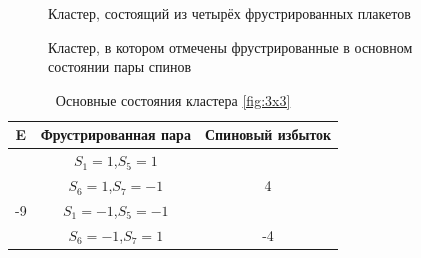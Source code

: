 \documentclass[utf8, babel, sor, jor, amsmath, amssymb, reprint]{elsarticle} %
\begin{document}
\begin{figure}[H]
	\centering
	\caption{Кластер, состоящий из четырёх фрустрированных плакетов}
	\label{fig:cl}
\end{figure}

\begin{figure}[H]
	\centering
	\caption{Кластер, в котором отмечены фрустрированные в основном состоянии пары спинов}
	\label{fig:clF}
\end{figure}

\begin{table}[H]
	\centering
	\begin{tabular}{|c|c|c|}
		\hline
		E   &   Фрустрированная пара & Спиновый избыток\\
		\hline
		   &  $S_1=1$,$S_5=1$&\\
		&    $S_6=1$,$S_7=-1$ & 4\\
	\cline{2-3}
		-9	\multirow{3}{*}{}
		   &  $S_1=-1$,$S_5=-1$&\\
		&    $S_6=-1$,$S_7=1$ & -4\\
		\hline
	\end{tabular}
	\caption{Основные состояния кластера \ref{fig:3x3}}
	\label{tab:gscl}
\end{table} 
\end{document}
